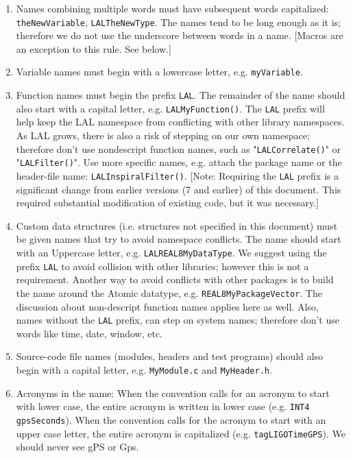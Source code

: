 \documentclass[]{ligodcc}
\begin{document}
\begin{enumerate}
\item
Names combining multiple words must have subsequent words
capitalized: {\tt theNewVariable}, {\tt LALTheNewType}.  The names tend to be
long enough as it is; therefore we do not use the underscore between
words in a name. [Macros are an exception to this rule. See below.]

\item
Variable names must begin with a lowercase letter, e.g.
{\tt myVariable}.

\item
Function names must begin the prefix {\tt LAL}. The remainder of the
name should also start with a capital letter, e.g. {\tt LALMyFunction()}.
The {\tt LAL} prefix will help keep the LAL namespace from conflicting with
other library namespaces.   As LAL grows, there is also a  risk of
stepping on our own namespace; therefore don't use nondescript
function names, such as "{\tt LALCorrelate()}" or "{\tt LALFilter()}".  Use more
specific names, e.g.  attach the package name or the header-file
name: {\tt LALInspiralFilter()}.  [Note: Requiring the {\tt LAL} prefix is a
significant change from earlier versions (7 and earlier) of this
document. This  required substantial modification of existing
code, but it was necessary.]

\item
Custom data structures (i.e. structures not specified in this
document) must be given names that try to avoid namespace conflicts.
The name should start with an  Uppercase letter, e.g.
{\tt LALREAL8MyDataType}. We suggest using the prefix {\tt LAL} to avoid collision
with other libraries; however this is not a requirement.  Another way
to avoid conflicts with other packages is to build the name around the
Atomic datatype, e.g. {\tt REAL8MyPackageVector}. The discussion about
non-descript function names applies here as well.  Also, names without
the {\tt LAL} prefix, can step on system names; therefore don't use words
like time, date, window, etc.

\item
Source-code file names (modules, headers and test programs)
should also begin with a capital letter, e.g. {\tt MyModule.c} and
{\tt MyHeader.h}.

\item
Acronyms in the name:  When the convention calls for an
acronym to start with lower case, the entire acronym is written in
lower case (e.g.  {\tt INT4 gpsSeconds}).  When the convention calls for the
acronym to start with an upper case letter, the entire acronym is
capitalized (e.g.  {\tt tagLIGOTimeGPS}). We should never see gPS or Gps.


\end{enumerate}
\end{document}
